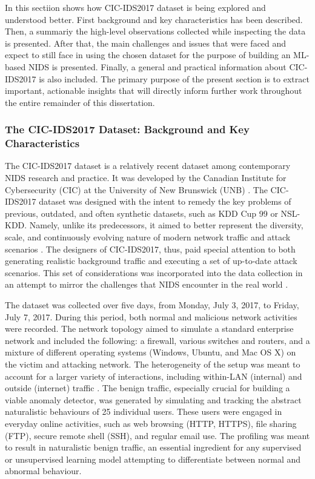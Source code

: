 In this sectiion shows how CIC-IDS2017 dataset is being explored and understood better. First background and key characteristics has been described. Then, a summariy the high-level observations collected while inspecting the data is presented. After that, the main challenges and issues that were faced and expect to still face in using the chosen dataset for the purpose of building an ML-based NIDS is presented. Finally, a general and practical information about CIC-IDS2017 is also included. The primary purpose of the present section is to extract important, actionable insights that will directly inform further work throughout the entire remainder of this dissertation.

\subsubsection{The CIC-IDS2017 Dataset: Background and Key Characteristics} 
The CIC-IDS2017 dataset is a relatively recent dataset among contemporary NIDS research and practice. It was developed by the Canadian Institute for Cybersecurity (CIC) at the University of New Brunswick (UNB) \parencite{sharafaldin2018toward1}. The CIC-IDS2017 dataset was designed with the intent to remedy the key problems of previous, outdated, and often synthetic datasets, such as KDD Cup 99 or NSL-KDD. Namely, unlike its predecessors, it aimed to better represent the diversity, scale, and continuously evolving nature of modern network traffic and attack scenarios \parencite {agrawal2021survey}. The designers of CIC-IDS2017, thus, paid special attention to both generating realistic background traffic and executing a set of up-to-date attack scenarios. This set of considerations was incorporated into the data collection in an attempt to mirror the challenges that NIDS encounter in the real world \parencite {aldhubaib2024network}.

The dataset was collected over five days, from Monday, July 3, 2017, to Friday, July 7, 2017. During this period, both normal and malicious network activities were recorded. The network topology aimed to simulate a standard enterprise network and included the following: a firewall, various switches and routers, and a mixture of different operating systems (Windows, Ubuntu, and Mac OS X) on the victim and attacking network. The heterogeneity of the setup was meant to account for a larger variety of interactions, including within-LAN (internal) and outside (internet) traffic \parencite {kumar2021cicids}. The benign traffic, especially crucial for building a viable anomaly detector, was generated by simulating and tracking the abstract naturalistic behaviours of 25 individual users. These users were engaged in everyday online activities, such as web browsing (HTTP, HTTPS), file sharing (FTP), secure remote shell (SSH), and regular email use. The profiling was meant to result in naturalistic benign traffic, an essential ingredient for any supervised or unsupervised learning model attempting to differentiate between normal and abnormal behaviour.

